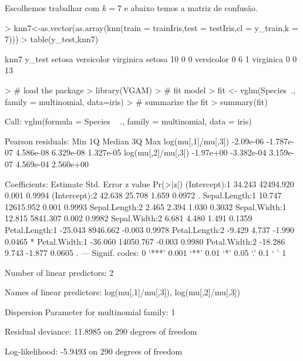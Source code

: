 \documentclass{article}
\begin{document}
Escolhemos trabalhar com $k=7$ e abaixo temos a matriz de confusão.
\begin{Schunk}
\begin{Sinput}
> knn7<-as.vector(as.array(knn(train = trainIris,test = testIris,cl = y_train,k = 7)))
> table(y_test,knn7)
\end{Sinput}
\begin{Soutput}
            knn7
y_test       setosa versicolor virginica
  setosa         10          0         0
  versicolor      0          6         1
  virginica       0          0        13
\end{Soutput}
\end{Schunk}

\begin{Schunk}
\begin{Sinput}
> # load the package
> library(VGAM)
> # fit model
> fit <- vglm(Species~., family = multinomial, data=iris)
> # summarize the fit
> summary(fit)
\end{Sinput}
\begin{Soutput}
Call:
vglm(formula = Species ~ ., family = multinomial, data = iris)

Pearson residuals:
                         Min         1Q    Median        3Q       Max
log(mu[,1]/mu[,3]) -2.09e-06 -1.787e-07 4.586e-08 6.329e-08 1.327e-05
log(mu[,2]/mu[,3]) -1.97e+00 -3.382e-04 3.159e-07 4.569e-04 2.560e+00

Coefficients:
                Estimate Std. Error z value Pr(>|z|)  
(Intercept):1     34.243  42494.920   0.001   0.9994  
(Intercept):2     42.638     25.708   1.659   0.0972 .
Sepal.Length:1    10.747  12615.952   0.001   0.9993  
Sepal.Length:2     2.465      2.394   1.030   0.3032  
Sepal.Width:1     12.815   5841.307   0.002   0.9982  
Sepal.Width:2      6.681      4.480   1.491   0.1359  
Petal.Length:1   -25.043   8946.662  -0.003   0.9978  
Petal.Length:2    -9.429      4.737  -1.990   0.0465 *
Petal.Width:1    -36.060  14050.767  -0.003   0.9980  
Petal.Width:2    -18.286      9.743  -1.877   0.0605 .
---
Signif. codes:  0 ‘***’ 0.001 ‘**’ 0.01 ‘*’ 0.05 ‘.’ 0.1 ‘ ’ 1

Number of linear predictors:  2 

Names of linear predictors: log(mu[,1]/mu[,3]), log(mu[,2]/mu[,3])

Dispersion Parameter for multinomial family:   1

Residual deviance: 11.8985 on 290 degrees of freedom

Log-likelihood: -5.9493 on 290 degrees of freedom


\end{Soutput}
\end{Schunk}
\end{document}
